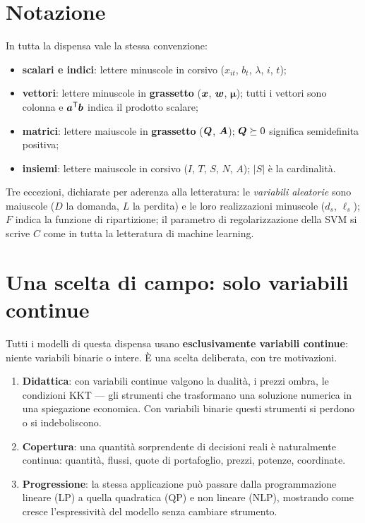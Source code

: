 \section{Notazione}

In tutta la dispensa vale la stessa convenzione:

\begin{itemize}
  \item \textbf{scalari e indici}: lettere minuscole in corsivo
        ($x_{it}$, $b_t$, $\lambda$, $i$, $t$);
  \item \textbf{vettori}: lettere minuscole in \textbf{grassetto}
        ($\boldsymbol{x}$, $\boldsymbol{w}$, $\boldsymbol\mu$); tutti i vettori sono colonna e
        $\boldsymbol{a}^{\mathsf T} \boldsymbol{b}$ indica il prodotto scalare;
  \item \textbf{matrici}: lettere maiuscole in \textbf{grassetto}
        ($\boldsymbol{Q}$, $\boldsymbol{A}$); $\boldsymbol{Q} \succeq 0$ significa semidefinita positiva;
  \item \textbf{insiemi}: lettere maiuscole in corsivo ($I$, $T$, $S$, $N$, $A$);
        $|S|$ è la cardinalità.
\end{itemize}

Tre eccezioni, dichiarate per aderenza alla letteratura: le \emph{variabili
aleatorie} sono maiuscole ($D$ la domanda, $L$ la perdita) e le loro realizzazioni
minuscole ($d_s$, $\ell_s$); $F$ indica la funzione di ripartizione; il parametro di
regolarizzazione della SVM si scrive $C$ come in tutta la letteratura di machine
learning.

\section{Una scelta di campo: solo variabili continue}

Tutti i modelli di questa dispensa usano \textbf{esclusivamente variabili continue}:
niente variabili binarie o intere. È una scelta deliberata, con tre motivazioni.

\begin{enumerate}
  \item \textbf{Didattica}: con variabili continue valgono la dualità, i prezzi ombra,
        le condizioni KKT --- gli strumenti che trasformano una soluzione numerica in
        una spiegazione economica. Con variabili binarie questi strumenti si perdono
        o si indeboliscono.
  \item \textbf{Copertura}: una quantità sorprendente di decisioni reali è naturalmente
        continua: quantità, flussi, quote di portafoglio, prezzi, potenze, coordinate.
  \item \textbf{Progressione}: la stessa applicazione può passare dalla programmazione
        lineare (LP) a quella quadratica (QP) e non lineare (NLP), mostrando come cresce
        l'espressività del modello senza cambiare strumento.
\end{enumerate}

